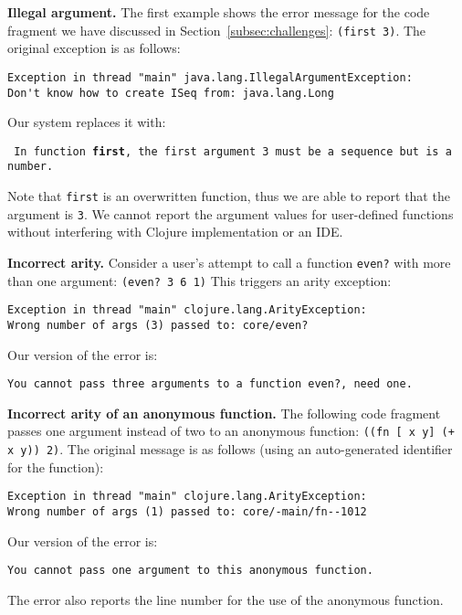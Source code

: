 \documentclass[submission,copyright,creativecommons]{eptcs}
\newcommand{\allcomments}[1]{{#1}}
\newcommand{\emcomment}[1]{{\bf \textcolor{ForestGreen}{\allcomments{{#1}}}}}
\begin{document}

{\bf Illegal argument. }
The first example shows the error message for the code fragment we have discussed in Section~\ref{subsec:challenges}:  {\tt (first 3)}. 
The original exception is as follows: 

\begin{verbatim}
Exception in thread "main" java.lang.IllegalArgumentException:
Don't know how to create ISeq from: java.lang.Long
\end{verbatim}

\noindent
Our system replaces it with:

\noindent
{\tt
In function {\bf first}, the first argument 3 must be a sequence but is a number.
}

Note that {\tt first} is an overwritten function, thus we are able to report that the argument is {\tt 3}. 
We cannot report the argument values for user-defined functions without interfering with Clojure
implementation or an IDE. 

{\bf Incorrect arity.}
Consider a user's attempt to call a function {\tt even?} with more than one argument: {\tt (even? 3 6 1)}
This triggers an arity exception:
\begin{verbatim}
Exception in thread "main" clojure.lang.ArityException:
Wrong number of args (3) passed to: core/even?
\end{verbatim}
Our version of the error is:
\begin{verbatim}
You cannot pass three arguments to a function even?, need one.
\end{verbatim}

{\bf Incorrect arity of an anonymous function.} The following code fragment passes one argument instead of two to an anonymous function:
{\tt ((fn [ x y] (+ x y)) 2)}. The original message is as follows (using an auto-generated identifier for the function): 
\begin{verbatim}
Exception in thread "main" clojure.lang.ArityException:
Wrong number of args (1) passed to: core/-main/fn--1012
\end{verbatim}
Our version of the error is:
\begin{verbatim}
You cannot pass one argument to this anonymous function.
\end{verbatim}
The error also reports the line number for the use of the anonymous function. 
\end{document}
